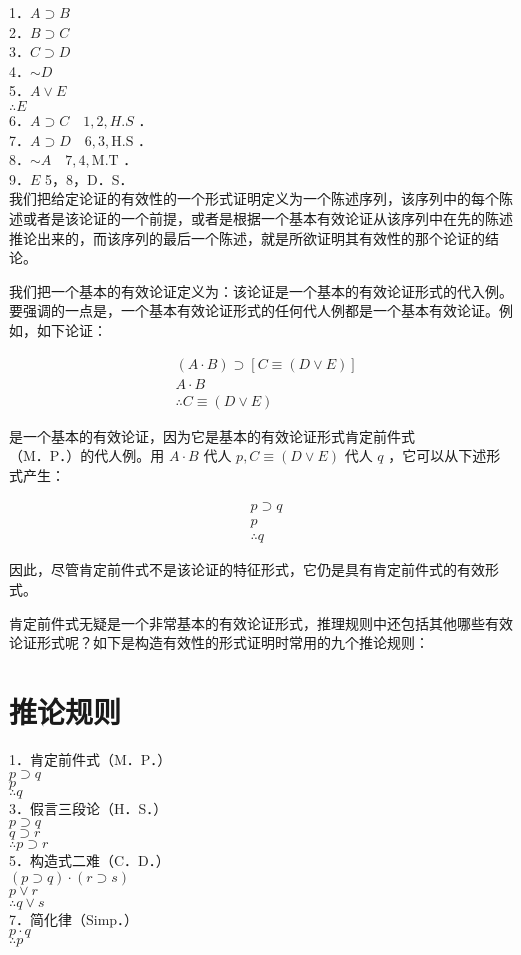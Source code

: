 1．$A \supset B$\\
2．$B \supset C$\\
3．$C \supset D$\\
4．$\sim D$\\
5．$A \vee E$\\
$\therefore E$\\
6．$A \supset C \quad 1,2, H . S$ ．\\
7．$A \supset D \quad 6,3, \mathrm{H} . \mathrm{S}$ ．\\
8．$\sim A \quad 7,4, \mathrm{M} . \mathrm{T}$ ．\\
9．$E$ 5，8，D．S．\\
我们把给定论证的有效性的一个形式证明定义为一个陈述序列，该序列中的每个陈述或者是该论证的一个前提，或者是根据一个基本有效论证从该序列中在先的陈述推论出来的，而该序列的最后一个陈述，就是所欲证明其有效性的那个论证的结论。

我们把一个基本的有效论证定义为：该论证是一个基本的有效论证形式的代入例。要强调的一点是，一个基本有效论证形式的任何代人例都是一个基本有效论证。例如，如下论证：

$$
\begin{aligned}
& (A \cdot B) \supset[C \equiv(D \vee E)] \\
& A \cdot B \\
& \therefore C \equiv(D \vee E)
\end{aligned}
$$

是一个基本的有效论证，因为它是基本的有效论证形式肯定前件式\\
（M．P．）的代人例。用 $A \cdot B$ 代人 $p, C \equiv(D \vee E)$ 代人 $q$ ，它可以从下述形式产生：

$$
\begin{aligned}
& p \supset q \\
& p \\
& \therefore q
\end{aligned}
$$

因此，尽管肯定前件式不是该论证的特征形式，它仍是具有肯定前件式的有效形式。

肯定前件式无疑是一个非常基本的有效论证形式，推理规则中还包括其他哪些有效论证形式呢？如下是构造有效性的形式证明时常用的九个推论规则：

\section*{推论规则}
1．肯定前件式（M．P．）\\
$p \supset q$\\
$p$\\
$\therefore q$\\
3．假言三段论（H．S．）\\
$p \supset q$\\
$q \supset r$\\
$\therefore p \supset r$\\
5．构造式二难（C．D．）\\
$(p \supset q) \cdot(r \supset s)$\\
$p \vee r$\\
$\therefore q \vee s$\\
7．简化律（Simp．）\\
$p \cdot q$\\
$\therefore p$

